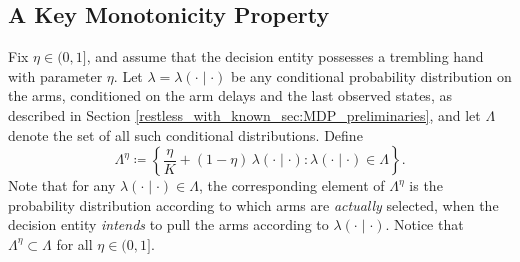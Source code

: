 \subsection{A Key Monotonicity Property}\label{restless_with_known_subsec:subsec_key_monotonicity_property}
Fix $\eta\in (0,1]$, and assume that the decision entity possesses a trembling hand with parameter $\eta$. 
Let $\lambda=\lambda(\cdot\mid \cdot)$ be any conditional probability distribution on the arms, conditioned on the arm delays and the last observed states, as described in Section \ref{restless_with_known_sec:MDP_preliminaries}, and let $\Lambda$ denote the set of all such conditional distributions. Define 
\begin{equation}
	\Lambda^\eta\coloneqq \left\lbrace \frac{\eta}{K}+(1-\eta)\,\lambda(\cdot\mid \cdot):\lambda(\cdot\mid \cdot)\in \Lambda \right\rbrace\label{restless_with_known_eq:Lambda^eta}.
\end{equation}
Note that for any $\lambda(\cdot\mid \cdot)\in \Lambda$, the corresponding element of $\Lambda^\eta$ is the probability distribution according to which arms are \emph{actually} selected, when the decision entity \emph{intends} to pull the arms according to $\lambda(\cdot\mid \cdot)$. Notice that $\Lambda^\eta\subset \Lambda$ for all $\eta\in(0,1]$. 

